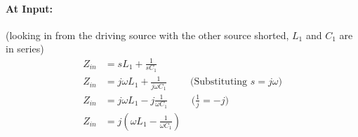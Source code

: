 \begin{enumerate}
    \paragraph{At Input:} (looking in from the driving source with the other
    source shorted, \(L_1\) and \(C_1\) are in series)
      \begin{align*}
        Z_{in} &= sL_1 + \frac{1}{sC_1} \\
        Z_{in} &= j \omega L_1 + \frac{1}{j \omega C_1} \hspace{1cm} \text{(Substituting \(s = j \omega\))} \\
        Z_{in} &= j \omega L_1 - j \frac{1}{\omega C_1} \hspace{1cm} \text{(\(\frac{1}{j} = -j\))} \\
        Z_{in} &= j \left( \omega L_1 - \frac{1}{\omega C_1} \right)
      \end{align*}

\end{enumerate}
